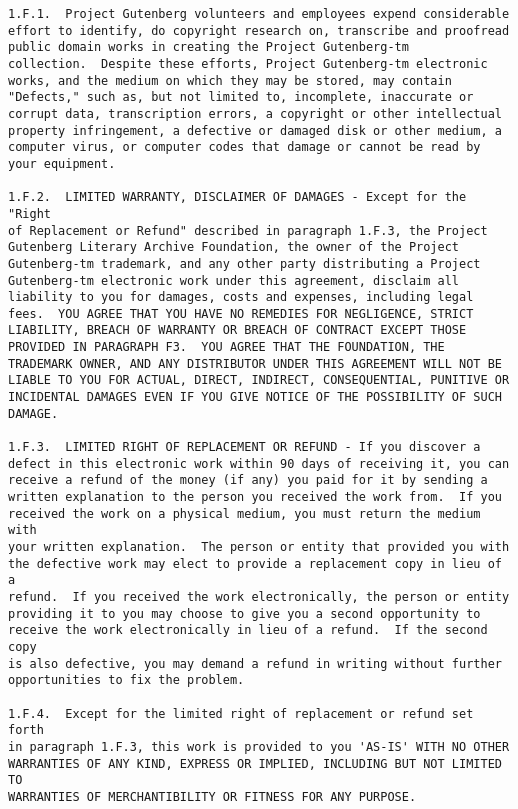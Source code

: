 \documentclass[11pt,leqno,oneside,letterpaper]{book}[2005/09/16]
\begin{document}
\begin{verbatim}
1.F.1.  Project Gutenberg volunteers and employees expend considerable
effort to identify, do copyright research on, transcribe and proofread
public domain works in creating the Project Gutenberg-tm
collection.  Despite these efforts, Project Gutenberg-tm electronic
works, and the medium on which they may be stored, may contain
"Defects," such as, but not limited to, incomplete, inaccurate or
corrupt data, transcription errors, a copyright or other intellectual
property infringement, a defective or damaged disk or other medium, a
computer virus, or computer codes that damage or cannot be read by
your equipment.

1.F.2.  LIMITED WARRANTY, DISCLAIMER OF DAMAGES - Except for the "Right
of Replacement or Refund" described in paragraph 1.F.3, the Project
Gutenberg Literary Archive Foundation, the owner of the Project
Gutenberg-tm trademark, and any other party distributing a Project
Gutenberg-tm electronic work under this agreement, disclaim all
liability to you for damages, costs and expenses, including legal
fees.  YOU AGREE THAT YOU HAVE NO REMEDIES FOR NEGLIGENCE, STRICT
LIABILITY, BREACH OF WARRANTY OR BREACH OF CONTRACT EXCEPT THOSE
PROVIDED IN PARAGRAPH F3.  YOU AGREE THAT THE FOUNDATION, THE
TRADEMARK OWNER, AND ANY DISTRIBUTOR UNDER THIS AGREEMENT WILL NOT BE
LIABLE TO YOU FOR ACTUAL, DIRECT, INDIRECT, CONSEQUENTIAL, PUNITIVE OR
INCIDENTAL DAMAGES EVEN IF YOU GIVE NOTICE OF THE POSSIBILITY OF SUCH
DAMAGE.

1.F.3.  LIMITED RIGHT OF REPLACEMENT OR REFUND - If you discover a
defect in this electronic work within 90 days of receiving it, you can
receive a refund of the money (if any) you paid for it by sending a
written explanation to the person you received the work from.  If you
received the work on a physical medium, you must return the medium with
your written explanation.  The person or entity that provided you with
the defective work may elect to provide a replacement copy in lieu of a
refund.  If you received the work electronically, the person or entity
providing it to you may choose to give you a second opportunity to
receive the work electronically in lieu of a refund.  If the second copy
is also defective, you may demand a refund in writing without further
opportunities to fix the problem.

1.F.4.  Except for the limited right of replacement or refund set forth
in paragraph 1.F.3, this work is provided to you 'AS-IS' WITH NO OTHER
WARRANTIES OF ANY KIND, EXPRESS OR IMPLIED, INCLUDING BUT NOT LIMITED TO
WARRANTIES OF MERCHANTIBILITY OR FITNESS FOR ANY PURPOSE.


\end{verbatim}
\end{document}
